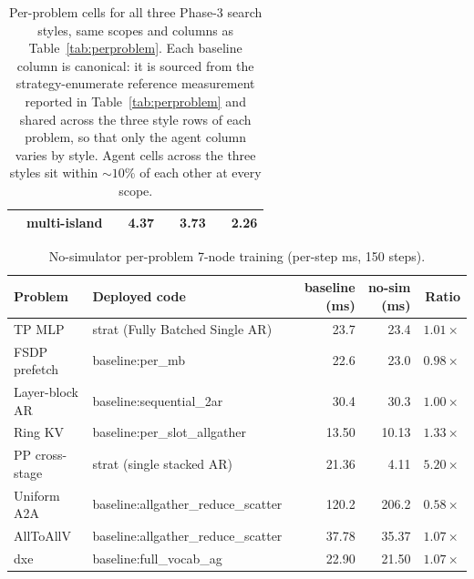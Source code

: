 \begin{table}[!htbp]
\begin{tabular}{llrrrrrr}
                                & multi-island       &                       &  4.37 &                       &  3.73 &                       &  2.26 \\
\bottomrule
\end{tabular}
\caption{Per-problem cells for all three Phase-3 search styles,
same scopes and columns as Table~\ref{tab:perproblem}. Each
baseline column is canonical: it is sourced from the
strategy-enumerate reference measurement reported in
Table~\ref{tab:perproblem} and shared across the three style
rows of each problem, so that only the agent column varies by
style. Agent cells across the three styles sit within
$\sim$$10$\% of each other at every scope.}
\label{tab:ablation-perproblem}
\end{table}

\begin{table}[!htbp]
\centering\small
\setlength{\tabcolsep}{4pt}
\begin{tabular}{llrrr}
\toprule
\textbf{Problem} & \textbf{Deployed code} & \textbf{baseline (ms)} & \textbf{no-sim (ms)} & \textbf{Ratio} \\
\midrule
TP MLP                & strat (Fully Batched Single AR)   & 23.7   & 23.4 & $1.01\times$ \\
FSDP prefetch         & baseline:per\_mb                  & 22.6   & 23.0 & $0.98\times$ \\
Layer-block AR        & baseline:sequential\_2ar          & 30.4   & 30.3 & $1.00\times$ \\
Ring KV               & baseline:per\_slot\_allgather     & 13.50  & 10.13 & $1.33\times$ \\
PP cross-stage  & strat (single stacked AR) & 21.36 & 4.11 & $5.20\times$ \\
Uniform A2A           & baseline:allgather\_reduce\_scatter      & 120.2 & 206.2 & $0.58\times$ \\
AllToAllV             & baseline:allgather\_reduce\_scatter      & 37.78 & 35.37 & $1.07\times$ \\
dxe                   & baseline:full\_vocab\_ag                 & 22.90 & 21.50 & $1.07\times$ \\
\bottomrule
\end{tabular}
\caption{No-simulator per-problem 7-node training (per-step ms, 150 steps).}
\label{tab:ablation-nosim-perproblem}
\end{table}



